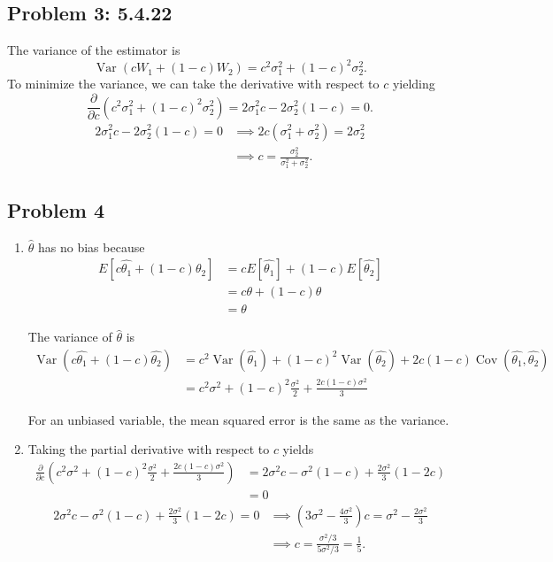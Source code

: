 \documentclass{article}
\newcommand{\var}{\operatorname{Var}}
\newcommand{\cov}{\operatorname{Cov}}
\begin{document}
\subsection*{Problem 3: 5.4.22}

The variance of the estimator is 
\[
	\var(cW_1 + (1-c)W_2) = c^2\sigma_1^2 + (1-c)^2\sigma_2^2. 
\]
To minimize the variance, 
we can take the derivative with respect to $c$ yielding
\[
	\frac{\partial}{\partial c} (c^2\sigma_1^2 + (1-c)^2\sigma_2^2)
	= 2\sigma_1^2c -2\sigma_2^2(1-c) 
	= 0.
\]
\begin{align*}
	2\sigma_1^2c -2\sigma_2^2(1-c) = 0
	&\implies 2c(\sigma_1^2 + \sigma_2^2) = 2\sigma_2^2 \\
	&\implies c = \frac{\sigma_2^2}{\sigma_1^2 + \sigma_2^2}.
\end{align*}
\newpage

\subsection*{Problem 4}

\begin{enumerate}
	\item $\hat{\theta}$ has no bias because 
	\begin{align*}
		E[c\hat{\theta_1} + (1-c)\hat{\theta_2}]
		&= cE[\hat{\theta_1}] + (1-c)E[\hat{\theta_2}] \\
		&= c\theta + (1-c)\theta \\
		&= \theta
	\end{align*}

	The variance of $\hat{\theta}$ is 
	\begin{align*}
		\var(c\hat{\theta_1} + (1-c)\hat{\theta_2}) 
		&= c^2\var(\hat{\theta_1}) + (1-c)^2\var(\hat{\theta_2}) 
		+2c(1-c)\cov(\hat{\theta_1}, \hat{\theta_2})\\
		&= c^2\sigma^2 + (1-c)^2\frac{\sigma^2}{2} + \frac{2c(1-c)\sigma^2}{3}
	\end{align*}

	For an unbiased variable, the mean squared error is the same as the variance.
	\item Taking the partial derivative with respect to $c$ yields
	\begin{align*}
		\frac{\partial}{\partial c} (c^2\sigma^2 + (1-c)^2\frac{\sigma^2}{2} + \frac{2c(1-c)\sigma^2}{3})
		&= 2\sigma^2c - \sigma^2(1-c) + \frac{2\sigma^2}{3}(1-2c)\\
		&= 0 
	\end{align*}
	\begin{align*}
		2\sigma^2c - \sigma^2(1-c) + \frac{2\sigma^2}{3}(1-2c) = 0
		&\implies (3\sigma^2 - \frac{4\sigma^2}{3})c = \sigma^2 - \frac{2\sigma^2}{3}\\
		&\implies c = \frac{\sigma^2/3}{5\sigma^2/3} = \frac{1}{5}.
	\end{align*}
\end{enumerate}
\newpage
\end{document}
